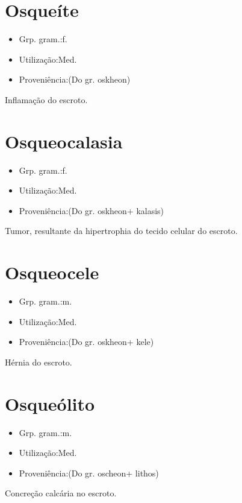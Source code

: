 \section{Osqueíte}
\begin{itemize}
\item {Grp. gram.:f.}
\end{itemize}
\begin{itemize}
\item {Utilização:Med.}
\end{itemize}
\begin{itemize}
\item {Proveniência:(Do gr. \textunderscore oskheon\textunderscore )}
\end{itemize}
Inflamação do escroto.
\section{Osqueocalasia}
\begin{itemize}
\item {Grp. gram.:f.}
\end{itemize}
\begin{itemize}
\item {Utilização:Med.}
\end{itemize}
\begin{itemize}
\item {Proveniência:(Do gr. \textunderscore oskheon\textunderscore  + \textunderscore kalasis\textunderscore )}
\end{itemize}
Tumor, resultante da hipertrophia do tecido celular do escroto.
\section{Osqueocele}
\begin{itemize}
\item {Grp. gram.:m.}
\end{itemize}
\begin{itemize}
\item {Utilização:Med.}
\end{itemize}
\begin{itemize}
\item {Proveniência:(Do gr. \textunderscore oskheon\textunderscore  + \textunderscore kele\textunderscore )}
\end{itemize}
Hérnia do escroto.
\section{Osqueólito}
\begin{itemize}
\item {Grp. gram.:m.}
\end{itemize}
\begin{itemize}
\item {Utilização:Med.}
\end{itemize}
\begin{itemize}
\item {Proveniência:(Do gr. \textunderscore oscheon\textunderscore  + \textunderscore lithos\textunderscore )}
\end{itemize}
Concreção calcária no escroto.
